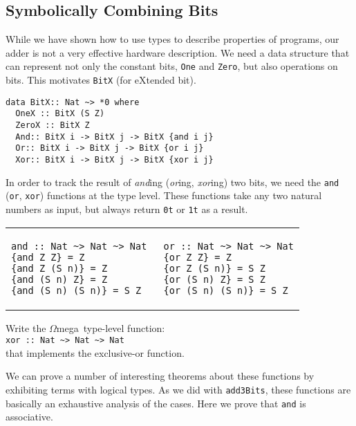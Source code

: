 \documentclass[11pt,twoside,A4]{llncs}
\newcommand{\om}{\emph{$\Omega$}mega}
\begin{document}
 \subsection{Symbolically Combining Bits}
 
 While we have shown how to use types to describe properties of programs, our adder
 is not a very effective hardware description.  We need a data structure that can
 represent not only the constant bits, \verb+One+ and \verb+Zero+, but also
 operations on bits. This motivates \verb+BitX+ (for eXtended bit).
 
{\small
\begin{verbatim}
data BitX:: Nat ~> *0 where
  OneX :: BitX (S Z)
  ZeroX :: BitX Z
  And:: BitX i -> BitX j -> BitX {and i j}
  Or:: BitX i -> BitX j -> BitX {or i j}
  Xor:: BitX i -> BitX j -> BitX {xor i j}
\end{verbatim}}

In order to track the result of {\it and}ing ({\it or}ing, {\it xor}ing) two bits,
we need the {\tt and} ({\tt or}, {\tt xor}) functions at the type level. These
functions take any two natural numbers as input, but always return \verb+0t+ or \verb+1t+
as a result.

\vspace*{.15in}
\hspace*{-0.25in}
\begin{tabular}{l|l}
\begin{minipage}[t]{2.0in}
{\small
\begin{verbatim}
and :: Nat ~> Nat ~> Nat
{and Z Z} = Z
{and Z (S n)} = Z
{and (S n) Z} = Z
{and (S n) (S n)} = S Z
\end{verbatim}}
\end{minipage}
&
\begin{minipage}[t]{2.0in}
{\small
\begin{verbatim}
 or :: Nat ~> Nat ~> Nat
 {or Z Z} = Z
 {or Z (S n)} = S Z
 {or (S n) Z} = S Z
 {or (S n) (S n)} = S Z
\end{verbatim}}
\end{minipage}
\end{tabular}

\begin{exercise}
Write the \om\ type-level function:\\
\verb+xor :: Nat ~> Nat ~> Nat+\\ that implements the exclusive-or function.
\end{exercise}
 

We can prove a number of interesting theorems about these functions
by exhibiting terms with logical types. As we did with \verb+add3Bits+,
these functions are basically an exhaustive analysis of the cases.
Here we prove that {\tt and} is associative.
\end{document}
